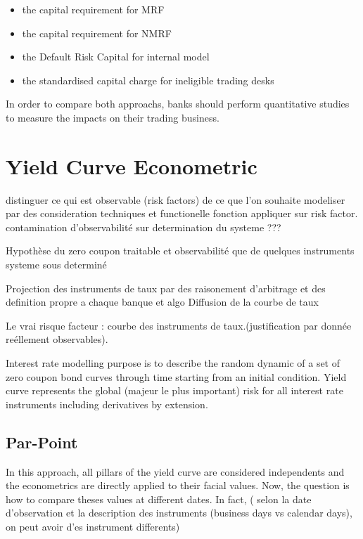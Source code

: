 \documentclass[10pt,a4paper]{report}
\begin{document}
\begin{itemize}
\item the capital requirement for MRF
\item the capital requirement for NMRF
\item the Default Risk Capital for internal model
\item the standardised capital charge for ineligible trading desks
\end{itemize}

\bigskip

In order to compare both approachs,  banks should perform quantitative studies to measure the impacts on their trading business.

\newpage
\section{Yield Curve Econometric}

\bigskip distinguer ce qui est observable (risk factors) de ce que l'on
souhaite modeliser par des consideration techniques et functionelle fonction
appliquer sur risk factor. contamination d'observabilit\'{e} 
sur determination du systeme ???

Hypoth\`{e}se du zero coupon traitable et observabilit\'{e} que de quelques
instruments  systeme sous determin\'{e}

Projection des instruments de taux par des raisonement d'arbitrage et des
definition propre a chaque banque et algo Diffusion de la courbe de taux

 Le vrai risque facteur : courbe des instruments de
taux.(justification par donn\'{e}e re\'{e}llement observables).

Interest rate modelling purpose is to describe the random dynamic of a set
of zero coupon bond curves through time starting from an initial condition.
Yield curve represents the global (majeur le plus important) risk for all
interest rate instruments including derivatives by extension.

\subsection{Par-Point}

In this approach, all pillars of the yield curve are considered independents
and the econometrics are directly applied to their facial values. Now, the
question is how to compare theses values at different dates. In fact, (
selon la date d'observation et la description des instruments (business days
vs calendar days), on peut avoir d'es instrument differents)
\end{document}
